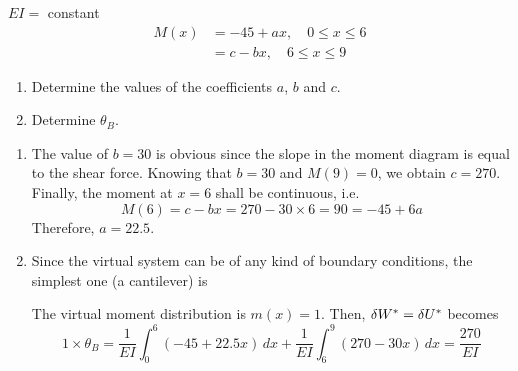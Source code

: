 \begin{example}
\leavevmode

\begin{minipage}{0.55\linewidth}\centering\end{minipage}\hfill
\begin{minipage}{0.42\linewidth}
  $EI =$ constant
  \begin{align*}
    M(x) &= -45 + ax,\quad 0\leq x\leq 6\\
         &= c - bx,\quad 6\leq x\leq 9
  \end{align*}
\end{minipage}
\begin{enumerate}[label=(\alph*)]
  \item Determine the values of the coefficients $a$, $b$ and $c$.
  \item Determine $\theta_B$.
\end{enumerate}
\begin{solution}
\begin{enumerate}[label=(\alph*)]
  \item The value of $b = 30$ is obvious since the slope in the moment diagram is equal to the shear force. Knowing that $b = 30$ and $M(9) = 0$, we obtain $c = 270$. Finally, the moment at $x = 6$ shall be continuous, i.e.
    \begin{equation*}
      M(6) = c - bx = 270 - 30\times6 = 90 = -45 + 6a
    \end{equation*}
    Therefore, $a = 22.5$.
  \item Since the virtual system can be of any kind of boundary conditions, the simplest one (a cantilever) is
    \begin{fig}
      
    \end{fig}
    The virtual moment distribution is $m(x) = 1$. Then, $\delta W^* = \delta U^*$ becomes
    \begin{equation*}
      1\times\theta_B = \frac{1}{EI}\int_0^6(-45 + 22.5x)\,dx + \frac{1}{EI}\int_6^9(270 - 30x)\,dx = \frac{270}{EI}
    \end{equation*}
\end{enumerate}
\end{solution}
\end{example}


